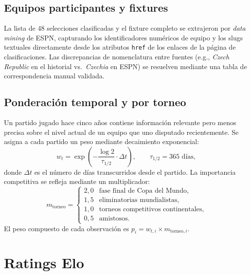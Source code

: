 \documentclass[12pt,a4paper]{article}
\begin{document}
\subsection{Equipos participantes y fixtures}

La lista de 48 selecciones clasificadas y el fixture completo se extrajeron por
\textit{data mining} de ESPN, capturando los identificadores numéricos de equipo
y los slugs textuales directamente desde los atributos \texttt{href} de los
enlaces de la página de clasificaciones. Las discrepancias de nomenclatura entre
fuentes (e.g., \textit{Czech Republic} en el historial vs.\ \textit{Czechia} en
ESPN) se resuelven mediante una tabla de correspondencia manual validada.

\subsection{Ponderación temporal y por torneo}

Un partido jugado hace cinco años contiene información relevante pero menos
precisa sobre el nivel actual de un equipo que uno disputado recientemente.
Se asigna a cada partido un peso mediante decaimiento exponencial:
\begin{equation}
  w_t = \exp\!\left(-\frac{\log 2}{\tau_{1/2}} \cdot \Delta t\right),
  \qquad \tau_{1/2} = 365 \text{ días},
  \label{eq:temporal-weight}
\end{equation}
donde $\Delta t$ es el número de días transcurridos desde el partido.
La importancia competitiva se refleja mediante un multiplicador:
\begin{equation}
  m_{\text{torneo}} = \begin{cases}
    2{,}0 & \text{fase final de Copa del Mundo,} \\
    1{,}5 & \text{eliminatorias mundialistas,} \\
    1{,}0 & \text{torneos competitivos continentales,} \\
    0{,}5 & \text{amistosos.}
  \end{cases}
  \label{eq:tournament-mult}
\end{equation}
El peso compuesto de cada observación es $p_i = w_{t,i} \times m_{\text{torneo},i}$.

\section{Ratings Elo}
\label{sec:elo}
\end{document}

